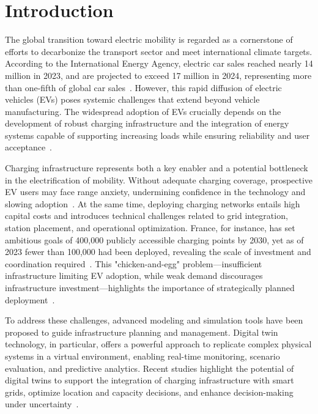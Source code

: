 \chapter{Introduction}\label{chap1}

The global transition toward electric mobility is regarded as a cornerstone of 
efforts to decarbonize the transport sector and meet international climate 
targets. According to the International Energy Agency, electric car sales 
reached nearly 14 million in 2023, and are projected to exceed 17 million 
in 2024, representing more than one-fifth of global car sales~\cite{IEA2024}. 
However, this rapid diffusion of electric vehicles (EVs) poses systemic 
challenges that extend beyond vehicle manufacturing. The widespread adoption 
of EVs crucially depends on the development of robust charging infrastructure 
and the integration of energy systems capable of supporting increasing loads 
while ensuring reliability and user acceptance~\cite{Metais2022}. 

Charging infrastructure represents both a key enabler and a potential bottleneck 
in the electrification of mobility. Without adequate charging coverage, 
prospective EV users may face range anxiety, undermining confidence in the 
technology and slowing adoption~\cite{Metais2022}. At the same time, 
deploying charging networks entails high capital costs and introduces 
technical challenges related to grid integration, station placement, and 
operational optimization. France, for instance, has set ambitious goals of 
400,000 publicly accessible charging points by 2030, yet as of 2023 fewer 
than 100,000 had been deployed, revealing the scale of investment and 
coordination required~\cite{Autorite2023}. This "chicken-and-egg"
problem—insufficient infrastructure limiting EV adoption, while weak demand 
discourages infrastructure investment—highlights the importance of 
strategically planned deployment~\cite{Bernard2021}.

To address these challenges, advanced modeling and simulation tools have been 
proposed to guide infrastructure planning and management. Digital twin 
technology, in particular, offers a powerful approach to replicate complex 
physical systems in a virtual environment, enabling real-time monitoring, 
scenario evaluation, and predictive analytics. Recent studies highlight the 
potential of digital twins to support the integration of charging infrastructure 
with smart grids, optimize location and capacity decisions, and enhance 
decision-making under uncertainty~\cite{Charette2023, Metais2022}. 


